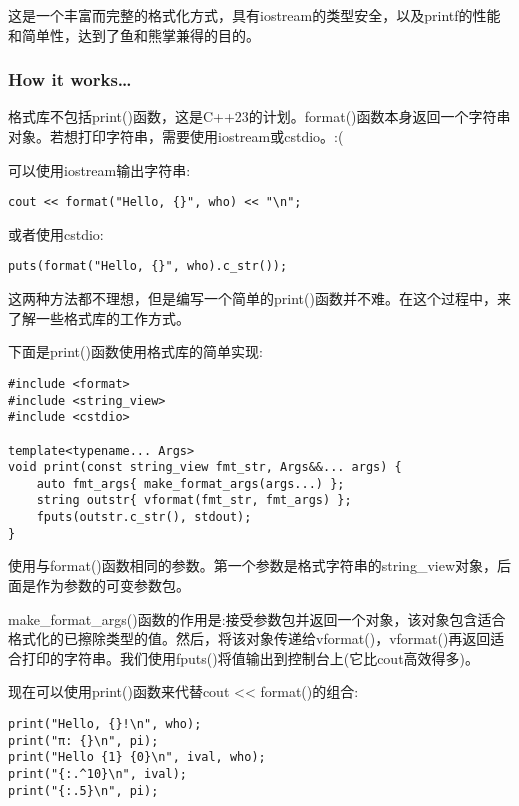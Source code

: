 这是一个丰富而完整的格式化方式，具有iostream的类型安全，以及printf的性能和简单性，达到了鱼和熊掌兼得的目的。

\subsubsection{How it works…}

格式库不包括print()函数，这是C++23的计划。format()函数本身返回一个字符串对象。若想打印字符串，需要使用iostream或cstdio。:(

可以使用iostream输出字符串:

\begin{lstlisting}[style=styleCXX]
cout << format("Hello, {}", who) << "\n";
\end{lstlisting}

或者使用cstdio:

\begin{lstlisting}[style=styleCXX]
puts(format("Hello, {}", who).c_str());
\end{lstlisting}

这两种方法都不理想，但是编写一个简单的print()函数并不难。在这个过程中，来了解一些格式库的工作方式。

下面是print()函数使用格式库的简单实现:

\begin{lstlisting}[style=styleCXX]
#include <format>
#include <string_view>
#include <cstdio>

template<typename... Args>
void print(const string_view fmt_str, Args&&... args) {
	auto fmt_args{ make_format_args(args...) };
	string outstr{ vformat(fmt_str, fmt_args) };
	fputs(outstr.c_str(), stdout);
}
\end{lstlisting}

使用与format()函数相同的参数。第一个参数是格式字符串的string\_view对象，后面是作为参数的可变参数包。

make\_format\_args()函数的作用是:接受参数包并返回一个对象，该对象包含适合格式化的已擦除类型的值。然后，将该对象传递给vformat()，vformat()再返回适合打印的字符串。我们使用fputs()将值输出到控制台上(它比cout高效得多)。

现在可以使用print()函数来代替cout << format()的组合:

\begin{lstlisting}[style=styleCXX]
print("Hello, {}!\n", who);
print("π: {}\n", pi);
print("Hello {1} {0}\n", ival, who);
print("{:.^10}\n", ival);
print("{:.5}\n", pi);
\end{lstlisting}

